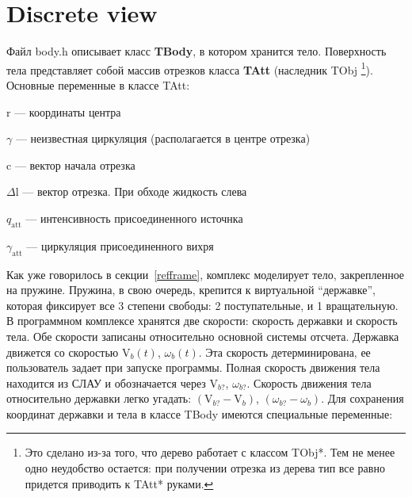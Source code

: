 \documentclass[14pt]{extreport}
\newcommand{\br}[1]{\boldsymbol{\mathrm{#1}}}
\renewcommand{\vec}[1]{\br{#1}}
\newcommand{\att}{\text{att}}
\newenvironment{packed_itemize}{
\begin{itemize}
  \setlength{\itemsep}{1pt}
  \setlength{\parskip}{0pt}
  \setlength{\parsep}{0pt}
}{\end{itemize}}
\begin{document}
\section{Discrete view}
\label{tbody}

Файл body.h описывает класс \textbf{TBody}, в котором хранится тело.
Поверхность тела представляет собой массив отрезков класса \textbf{TAtt} (наследник TObj
\footnote{Это сделано из-за того, что дерево работает с классом TObj*. Тем не менее одно неудобство остается: при получении отрезка из дерева тип все равно придется приводить к TAtt* руками.}).\\

Основные переменные в классе TAtt:
\begin{packed_itemize}
\item $\vec r$ --- координаты центра
\item $\gamma$ --- неизвестная циркуляция (располагается в центре отрезка)
\item $\vec c$ --- вектор начала отрезка
\item $\Delta \vec l$ --- вектор отрезка. При обходе жидкость слева
\item $q_\att$ --- интенсивность присоединенного источнка
\item $\gamma_\att$ --- циркуляция присоединенного вихря
\end{packed_itemize}

Как уже говорилось в секции~\ref{refframe}, комплекс моделирует тело, закрепленное на пружине. Пружина, в свою очередь, крепится к виртуальной ``державке'', которая фиксирует все 3 степени свободы: 2 поступательные, и 1 вращательную.
В программном комплексе хранятся две скорости: скорость державки и скорость тела. Обе скорости записаны относительно основной системы отсчета. Державка движется со скоростью $\vec V_b(t)$, $\omega_b(t)$. Эта скорость детерминирована, ее пользователь задает при запуске программы. Полная скорость движения тела находится из СЛАУ и обозначается через $\vec V_{b?}$, $\omega_{b?}$. Скорость движения тела относительно державки легко угадать: $(\vec V_{b?} - \vec V_b)$, $(\omega_{b?} - \omega_b)$. Для сохранения координат державки и тела в классе TBody имеются специальные переменные: 
\end{document}
